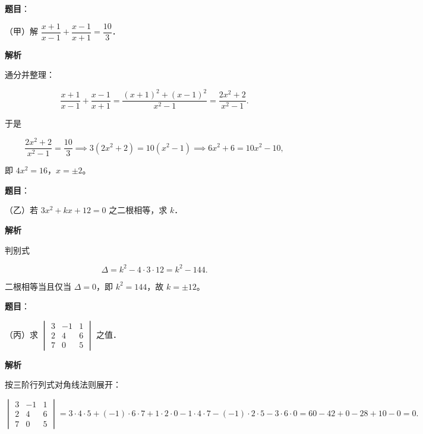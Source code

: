 
\begin{answer}

\textbf{题目}：

（甲）解 $\dfrac{x+1}{x-1}+\dfrac{x-1}{x+1}=\dfrac{10}{3}$．

\textbf{解析}

通分并整理：

\nopagebreak[4]
\[
\frac{x+1}{x-1}+\frac{x-1}{x+1}=\frac{(x+1)^2+(x-1)^2}{x^2-1}=\frac{2x^2+2}{x^2-1}.
\]

于是

\nopagebreak[4]
\[
\frac{2x^2+2}{x^2-1}=\frac{10}{3}
\implies 3(2x^2+2)=10(x^2-1)
\implies 6x^2+6=10x^2-10,
\]

即 $4x^2=16$，$x=\pm2$。


\end{answer}
\begin{answer}

\textbf{题目}：

（乙）若 $3x^2+kx+12=0$ 之二根相等，求 $k$．

\textbf{解析}

判别式

\nopagebreak[4]
\[
\Delta=k^2-4\cdot3\cdot12=k^2-144.
\]

二根相等当且仅当 $\Delta=0$，即 $k^2=144$，故 $k=\pm12$。


\end{answer}
\begin{answer}

\textbf{题目}：

（丙）求 $\begin{vmatrix}3&-1&1\\2&4&6\\7&0&5\end{vmatrix}$ 之值．

\textbf{解析}

按三阶行列式对角线法则展开：

\nopagebreak[4]
\[
\begin{vmatrix}3&-1&1\\2&4&6\\7&0&5\end{vmatrix}
=3\cdot4\cdot5+(-1)\cdot6\cdot7+1\cdot2\cdot0-1\cdot4\cdot7-(-1)\cdot2\cdot5-3\cdot6\cdot0
=60-42+0-28+10-0=0.
\]


\end{answer}
